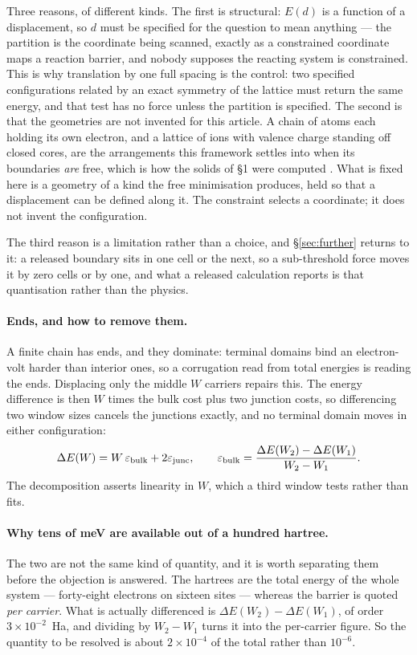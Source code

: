\documentclass[11pt]{article}
\begin{document}
Three reasons, of different kinds. The first is structural: $E(d)$ is a function of a displacement,
so $d$ must be specified for the question to mean anything --- the partition is the coordinate being
scanned, exactly as a constrained coordinate maps a reaction barrier, and nobody supposes the
reacting system is constrained. This is why translation by one full spacing is the control: two
specified configurations related by an exact symmetry of the lattice must return the same energy,
and that test has no force unless the partition is specified. The second is that the geometries are not
invented for this article. A chain of atoms each holding its own electron, and a lattice of ions
with valence charge standing off closed cores, are the arrangements this framework settles into when
its boundaries \emph{are} free, which is how the solids of \S1 were computed \cite{code}. What is
fixed here is a geometry of a kind the free minimisation produces,
held so that a displacement can be defined along it. The constraint selects a coordinate; it does
not invent the configuration.

The third reason is a limitation rather than a choice, and \S\ref{sec:further} returns to it: a
released boundary sits in one cell or the next, so a sub-threshold force moves it by zero cells or
by one, and what a released calculation reports is that quantisation rather than the physics.

\paragraph{Ends, and how to remove them.} A finite chain has ends, and they dominate: terminal
domains bind an electron-volt harder than interior ones, so a corrugation read from total energies is
reading the ends. Displacing only the middle $W$ carriers repairs this. The energy difference is then
$W$ times the bulk cost plus two junction costs, so differencing two window sizes cancels the
junctions exactly, and no terminal domain moves in either configuration:
\begin{equation}\label{eq:window}
\Delta E(W) = W\,\varepsilon_{\rm bulk} + 2\varepsilon_{\rm junc},
\qquad
\varepsilon_{\rm bulk} = \frac{\Delta E(W_2)-\Delta E(W_1)}{W_2-W_1}.
\end{equation}
The decomposition asserts linearity in $W$, which a third window tests rather than fits.

\paragraph{Why tens of meV are available out of a hundred hartree.} The two are not the same kind of
quantity, and it is worth separating them before the objection is answered. The hartrees are the
total energy of the whole system --- forty-eight electrons on sixteen sites --- whereas the barrier
is quoted \emph{per carrier}. What is actually differenced is $\Delta E(W_2)-\Delta E(W_1)$, of order
$3\times10^{-2}$~Ha, and dividing by $W_2-W_1$ turns it into the per-carrier figure. So the quantity
to be resolved is about $2\times10^{-4}$ of the total rather than $10^{-6}$.
\end{document}
